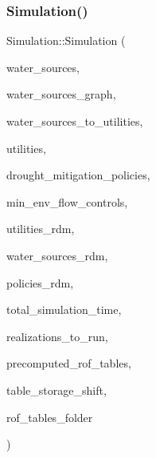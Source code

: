 \subsubsection{\texorpdfstring{Simulation()}{Simulation()}\hspace{0.1cm}{\footnotesize\ttfamily [2/3]}}
{\footnotesize\ttfamily Simulation\+::\+Simulation (\begin{DoxyParamCaption}\item[{vector$<$ \mbox{\hyperlink{classWaterSource}{Water\+Source}} $\ast$$>$ \&}]{water\+\_\+sources,  }\item[{\mbox{\hyperlink{classGraph}{Graph}} \&}]{water\+\_\+sources\+\_\+graph,  }\item[{const vector$<$ vector$<$ int $>$$>$ \&}]{water\+\_\+sources\+\_\+to\+\_\+utilities,  }\item[{vector$<$ \mbox{\hyperlink{classUtility}{Utility}} $\ast$$>$ \&}]{utilities,  }\item[{const vector$<$ \mbox{\hyperlink{classDroughtMitigationPolicy}{Drought\+Mitigation\+Policy}} $\ast$$>$ \&}]{drought\+\_\+mitigation\+\_\+policies,  }\item[{vector$<$ \mbox{\hyperlink{classMinEnvFlowControl}{Min\+Env\+Flow\+Control}} $\ast$$>$ \&}]{min\+\_\+env\+\_\+flow\+\_\+controls,  }\item[{vector$<$ vector$<$ double $>$$>$ \&}]{utilities\+\_\+rdm,  }\item[{vector$<$ vector$<$ double $>$$>$ \&}]{water\+\_\+sources\+\_\+rdm,  }\item[{vector$<$ vector$<$ double $>$$>$ \&}]{policies\+\_\+rdm,  }\item[{const unsigned long}]{total\+\_\+simulation\+\_\+time,  }\item[{vector$<$ unsigned long $>$ \&}]{realizations\+\_\+to\+\_\+run,  }\item[{vector$<$ vector$<$ \mbox{\hyperlink{classMatrix2D}{Matrix2D}}$<$ double $>$$>$$>$ \&}]{precomputed\+\_\+rof\+\_\+tables,  }\item[{vector$<$ vector$<$ double $>$$>$ \&}]{table\+\_\+storage\+\_\+shift,  }\item[{string \&}]{rof\+\_\+tables\+\_\+folder }\end{DoxyParamCaption})}

\mbox{\label{classSimulation_a68f43435cf8308d5415cdfcdb84e1fac}} 

